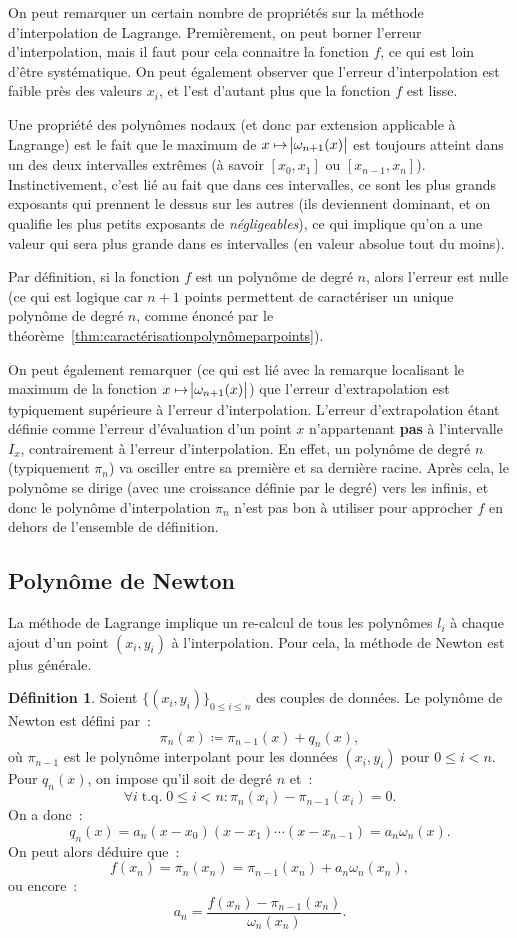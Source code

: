 \documentclass{article}
\theoremstyle{definition}
\newtheorem{déf}[thm]{Définition}
\theoremstyle{remark}
\DeclareMathOperator{\tq}{t.q.}  %
\begin{document}
		On peut remarquer un certain nombre de propriétés sur la méthode d'interpolation de Lagrange. Premièrement, on peut borner l'erreur d'interpolation,
		mais il faut pour cela connaitre la fonction $f$, ce qui est loin d'être systématique. On peut également observer que l'erreur d'interpolation est
		faible près des valeurs $x_i$, et l'est d'autant plus que la fonction $f$ est lisse.

		Une propriété des polynômes nodaux (et donc par extension applicable à Lagrange) est le fait que le maximum de $x \mapsto \abs {\omega_{n+1}(x)}$
		est toujours atteint dans un des deux intervalles extrêmes (à savoir $[x_0, x_1]$ ou $[x_{n-1}, x_n]$). Instinctivement, c'est lié au fait que dans
		ces intervalles, ce sont les plus grands exposants qui prennent le dessus sur les autres (ils deviennent dominant, et on qualifie les plus petits
		exposants de \emph{négligeables}), ce qui implique qu'on a une valeur qui sera plus grande dans es intervalles (en valeur absolue tout du moins).

		Par définition, si la fonction $f$ est un polynôme de degré $n$, alors l'erreur est nulle (ce qui est logique car $n+1$ points permettent de caractériser
		un unique polynôme de degré $n$, comme énoncé par le théorème~\ref{thm:caractérisationpolynômeparpoints}).

		On peut également remarquer (ce qui est lié avec la remarque localisant le maximum de la fonction $x \mapsto \abs{\omega_{n+1}(x)}$) que l'erreur
		d'extrapolation est typiquement supérieure à l'erreur d'interpolation. L'erreur d'extrapolation étant définie comme l'erreur d'évaluation d'un point $x$
		n'appartenant \textbf{pas} à l'intervalle $I_x$, contrairement à l'erreur d'interpolation. En effet, un polynôme de degré $n$ (typiquement $\pi_n$)
		va osciller entre sa première et sa dernière racine. Après cela, le polynôme se dirige (avec une croissance définie par le degré) vers les infinis,
		et donc le polynôme d'interpolation $\pi_n$ n'est pas bon à utiliser pour approcher $f$ en dehors de l'ensemble de définition.

		\subsection{Polynôme de Newton}
		La méthode de Lagrange implique un re-calcul de tous les polynômes $l_i$ à chaque ajout d'un point $(x_i, y_i)$ à l'interpolation. Pour cela, la méthode
		de Newton est plus générale.

		\begin{déf} Soient $\{(x_i, y_i)\}_{0 \leq i \leq n}$ des couples de données. Le polynôme de Newton est défini par~:
		\[\pi_n(x) \coloneqq \pi_{n-1}(x) + q_n(x),\]
		où $\pi_{n-1}$ est le polynôme interpolant pour les données $(x_i, y_i)$ pour $0 \leq i < n$. Pour $q_n(x)$, on impose qu'il soit de degré $n$ et~:
		\[\forall i \tq 0 \leq i < n : \pi_n(x_i) - \pi_{n-1}(x_i) = 0.\]
		On a donc~:
		\[q_n(x) = a_n(x-x_0)(x-x_1)\dotsm(x-x_{n-1}) = a_n\omega_n(x).\]
		On peut alors déduire que~:
		\[f(x_n) = \pi_n(x_n) = \pi_{n-1}(x_n) + a_n\omega_n(x_n),\]
		ou encore~:
		\[a_n = \frac {f(x_n)-\pi_{n-1}(x_n)}{\omega_n(x_n)}.\]
		\end{déf}
\end{document}
